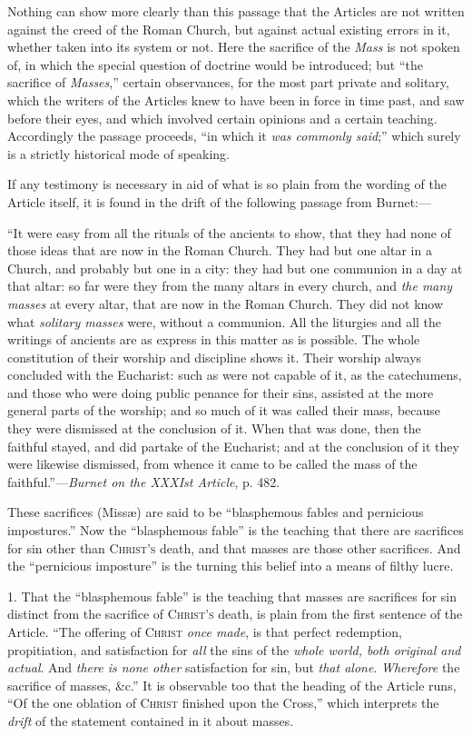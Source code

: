 Nothing can show more clearly than this passage that the Articles
are not written against the creed of the Roman Church, but against
actual existing errors in it, whether taken into its system or not.
Here the sacrifice of the \emph{Mass} is not spoken of, in which the
special question of doctrine would be introduced; but ``the
sacrifice of \emph{Masses},'' certain observances, for the most
part private and solitary, which the writers of the Articles knew to
have been in force in time past, and saw before their eyes, and which
involved certain opinions and a certain teaching. Accordingly the
passage proceeds, ``in which it \emph{was commonly said};''
which surely is a strictly historical mode of speaking.

If any testimony is necessary in aid of what is so plain from the
wording of the Article itself, it is found in the drift of the
following passage from Burnet:—

``It were easy from all the rituals of the
ancients to show, that they had none of those ideas that are now in
the Roman Church. They had but one altar in a Church, and probably but
one in a city: they had but one communion in a day at that altar: so
far were they from the many altars in every church, and \emph{the many
masses} at every altar, that are now in the Roman Church. They did
not know what \emph{solitary masses} were, without a communion. All
the liturgies and all the writings of ancients are as express in this
matter as is possible. The whole constitution of their worship and
discipline shows it. Their worship always concluded with the
Eucharist: such as were not capable of it, as the catechumens, and
those who were doing public penance for their sins, assisted at
the more general parts of the worship; and so much of it was called
their mass, because they were dismissed at the conclusion of it. When
that was done, then the faithful stayed, and did partake of the
Eucharist; and at the conclusion of it they were likewise dismissed,
from whence it came to be called the mass of the faithful.''—\emph{Burnet
on the XXXIst Article}, p. 482.

These sacrifices (Missæ) are said to be ``blasphemous fables
and pernicious impostures.'' Now the ``blasphemous fable'' is
the teaching that there are sacrifices for sin other than C\textsc{hrist's}
death, and that masses are those other sacrifices. And the
``pernicious imposture'' is the turning this belief into a
means of filthy lucre.

1. That the ``blasphemous fable'' is the teaching that
masses are sacrifices for sin distinct from the sacrifice of C\textsc{hrist's}
death, is plain from the first sentence of the Article. ``The
offering of C\textsc{hrist} \emph{once made}, is that
perfect redemption, propitiation, and satisfaction for \emph{all} the
sins of the \emph{whole world, both original and actual}. And \emph{there
is none other} satisfaction for sin, but \emph{that alone}. \emph{Wherefore}
the sacrifice of masses, \&c.'' It is observable too that the
heading of the Article runs, ``Of the one oblation of C\textsc{hrist}
finished upon the Cross,'' which interprets the \emph{drift} of
the statement contained in it about masses.

